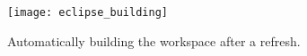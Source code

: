 \newpage
\visHeader

\begin{figure}[htbp]
	\centering
  \texttt{[image: eclipse\_building]}
	\caption{Automatically building the workspace after a refresh.}
	\label{fig_eclipsebuilding}
\end{figure}
